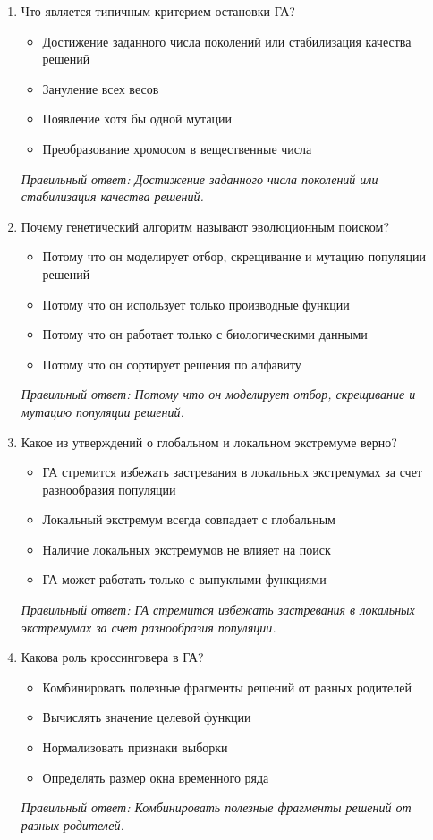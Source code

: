\begin{enumerate}[label=\textbf{\arabic*.}, leftmargin=0pt, itemsep=1.2em]
\item Что является типичным критерием остановки ГА?
\begin{itemize}[label=$\square$, leftmargin=1.5cm, itemsep=0.2em, topsep=0.3em]
\item Достижение заданного числа поколений или стабилизация качества решений
\item Зануление всех весов
\item Появление хотя бы одной мутации
\item Преобразование хромосом в вещественные числа
\end{itemize}
{\small\textit{Правильный ответ: Достижение заданного числа поколений или стабилизация качества решений.}}

\item Почему генетический алгоритм называют эволюционным поиском?
\begin{itemize}[label=$\square$, leftmargin=1.5cm, itemsep=0.2em, topsep=0.3em]
\item Потому что он моделирует отбор, скрещивание и мутацию популяции решений
\item Потому что он использует только производные функции
\item Потому что он работает только с биологическими данными
\item Потому что он сортирует решения по алфавиту
\end{itemize}
{\small\textit{Правильный ответ: Потому что он моделирует отбор, скрещивание и мутацию популяции решений.}}

\item Какое из утверждений о глобальном и локальном экстремуме верно?
\begin{itemize}[label=$\square$, leftmargin=1.5cm, itemsep=0.2em, topsep=0.3em]
\item ГА стремится избежать застревания в локальных экстремумах за счет разнообразия популяции
\item Локальный экстремум всегда совпадает с глобальным
\item Наличие локальных экстремумов не влияет на поиск
\item ГА может работать только с выпуклыми функциями
\end{itemize}
{\small\textit{Правильный ответ: ГА стремится избежать застревания в локальных экстремумах за счет разнообразия популяции.}}

\item Какова роль кроссинговера в ГА?
\begin{itemize}[label=$\square$, leftmargin=1.5cm, itemsep=0.2em, topsep=0.3em]
\item Комбинировать полезные фрагменты решений от разных родителей
\item Вычислять значение целевой функции
\item Нормализовать признаки выборки
\item Определять размер окна временного ряда
\end{itemize}
{\small\textit{Правильный ответ: Комбинировать полезные фрагменты решений от разных родителей.}}


\end{enumerate}
